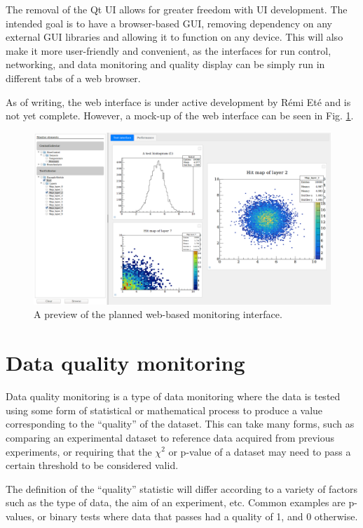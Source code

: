 The removal of the Qt UI allows for greater freedom with UI development. The intended goal is to have a browser-based GUI, removing dependency on any external GUI libraries and allowing it to function on any device. This will also make it more user-friendly and convenient, as the interfaces for run control, networking, and data monitoring and quality display can be simply run in different tabs of a web browser.

As of writing, the web interface is under active development by R\'{e}mi Et\'{e} and is not yet complete. However, a mock-up of the web interface can be seen in Fig. \ref{figure:daq/dqm4hep/future-gui}.

\begin{figure}[h]
	\centering
	\includegraphics[width=1.0\textwidth]{../Pictures/ScreenshotWebMonitoring.png}
	\caption{A preview of the planned web-based monitoring interface.}
	\label{figure:daq/dqm4hep/future-gui}
\end{figure}

\section{Data quality monitoring} %
Data quality monitoring is a type of data monitoring where the data is tested using some form of statistical or mathematical process to produce a value corresponding to the ``quality'' of the dataset. This can take many forms, such as comparing an experimental dataset to reference data acquired from previous experiments, or requiring that the $\chi^2$ or p-value of a dataset may need to pass a certain threshold to be considered valid.

The definition of the ``quality'' statistic will differ according to a variety of factors such as the type of data, the aim of an experiment, etc. Common examples are p-values, or binary tests where data that passes had a quality of 1, and 0 otherwise.

